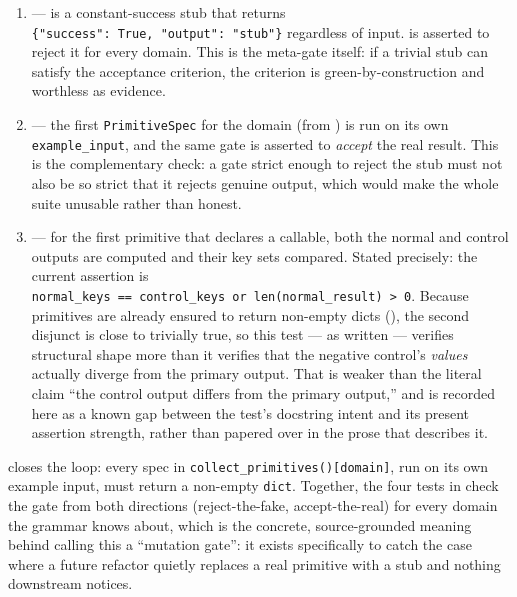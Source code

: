\documentclass[
]{article}
\newcounter{none} %
\providecommand{\tightlist}{%
  \setlength{\itemsep}{0pt}\setlength{\parskip}{0pt}}
\begin{document}
\begin{enumerate}
\def\labelenumi{\arabic{enumi}.}
\tightlist
\item
  \textbf{} ---
   is a constant-success stub that returns
  \texttt{\{"success":\ True,\ "output":\ "stub"\}} regardless of input.
   is asserted to reject it
  for every domain. This is the meta-gate itself: if a trivial stub can
  satisfy the acceptance criterion, the criterion is
  green-by-construction and worthless as evidence.
\item
  \textbf{} ---
  the first \texttt{PrimitiveSpec} for the domain (from
  ) is run on its own
  \texttt{example\_input}, and the same gate is asserted to
  \emph{accept} the real result. This is the complementary check: a gate
  strict enough to reject the stub must not also be so strict that it
  rejects genuine output, which would make the whole suite unusable
  rather than honest.
\item
  \textbf{}
  --- for the first primitive that declares a 
  callable, both the normal and control outputs are computed and their
  key sets compared. Stated precisely: the current assertion is
  \texttt{normal\_keys\ ==\ control\_keys\ or\ len(normal\_result)\ \textgreater{}\ 0}.
  Because primitives are already ensured to return non-empty dicts
  (), the second
  disjunct is close to trivially true, so this test --- as written ---
  verifies structural shape more than it verifies that the negative
  control's \emph{values} actually diverge from the primary output. That
  is weaker than the literal claim ``the control output differs from the
  primary output,'' and is recorded here as a known gap between the
  test's docstring intent and its present assertion strength, rather
  than papered over in the prose that describes it.
\end{enumerate}

 closes the
loop: every spec in \texttt{collect\_primitives(){[}domain{]}}, run on
its own example input, must return a non-empty \texttt{dict}. Together,
the four tests in  check the gate from both
directions (reject-the-fake, accept-the-real) for every domain the
grammar knows about, which is the concrete, source-grounded meaning
behind calling this a ``mutation gate'': it exists specifically to catch
the case where a future refactor quietly replaces a real primitive with
a stub and nothing downstream notices.
\end{document}
